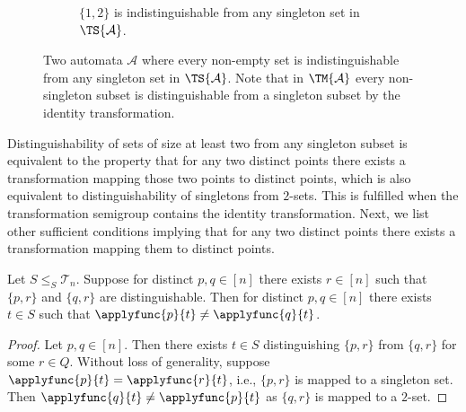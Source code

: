 \begin{example}
\begin{figure}
\begin{subfigure}{0.36\textwidth}
	\caption{$\{1,2\}$ is indistinguishable from any singleton set in~$\TS{\mathcal A}$.}
		\label{sync_max:fig:two-state}
	\end{subfigure}
	\caption[Non-empty sets indistinguishable from singleton set in $\TS{\mathcal A}$]{Two automata $\mathcal A$ where every non-empty set is indistinguishable from any singleton set in $\TS{\mathcal A}$. Note that in $\TM{\mathcal A}$ every non-singleton subset is distinguishable from a singleton subset by the identity transformation.} 
\label{sync_max:fig:no-singleton} 
\end{figure}
\end{example} 

Distinguishability of sets of size at least two
from any singleton subset is equivalent to the property
that for any two distinct points there exists
a transformation mapping those two points to distinct points, which is also equivalent
to distinguishability of
singletons from $2$-sets.
This is fulfilled when the transformation semigroup 
contains the identity transformation.
Next, we list other sufficient conditions
implying that for any two distinct points there exists a transformation
mapping them to distinct points.

\begin{lemma} \label{sync_max:lem:3sets-two-states-injective}
Let $S \le_S \mathcal T_n$.
Suppose for distinct $p,q \in [n]$
there exists $r \in [n]$
such that $\{p,r\}$ and $\{q,r\}$
are distinguishable.
Then for distinct $p,q \in [n]$
there exists $t \in S$ such that $\applyfunc{p}{t} \ne \applyfunc{q}{t}$.
\end{lemma} 
\begin{proof}
	Let $p,q \in [n]$.
	Then there exists $t \in S$ distinguishing $\{p, r\}$
	from $\{q,r\}$ for some $r \in Q$.
	 Without loss of generality, suppose $\applyfunc{p}{t} = \applyfunc{r}{t}$, i.e.,
	$\{p,r\}$ is mapped to a singleton set.
	Then $\applyfunc{q}{t} \ne \applyfunc{p}{t}$
	as $\{q, r\}$ is mapped to a $2$-set.		
\end{proof} 

